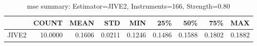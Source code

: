 \begin{table}[ht]
\centering
\caption{mse summary: Estimator=JIVE2, Instruments=166, Strength=0.80}
\begin{tabular}{lrrrrrrrr}
\toprule
 & COUNT & MEAN & STD & MIN & 25\% & 50\% & 75\% & MAX \\
\midrule
JIVE2 & 10.0000 & 0.1606 & 0.0211 & 0.1246 & 0.1486 & 0.1588 & 0.1802 & 0.1882 \\
\bottomrule
\end{tabular}
\end{table}

